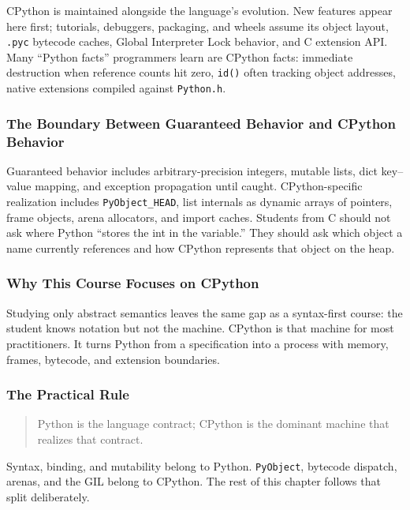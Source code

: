 CPython is maintained alongside the language's evolution. New features appear here first; tutorials, debuggers, packaging, and wheels assume its object layout, \texttt{.pyc} bytecode caches, Global Interpreter Lock behavior, and C extension API. Many ``Python facts'' programmers learn are CPython facts: immediate destruction when reference counts hit zero, \texttt{id()} often tracking object addresses, native extensions compiled against \texttt{Python.h}.

\subsubsection{The Boundary Between Guaranteed Behavior and CPython Behavior}

Guaranteed behavior includes arbitrary-precision integers, mutable lists, dict key--value mapping, and exception propagation until caught. CPython-specific realization includes \texttt{PyObject\_HEAD}, list internals as dynamic arrays of pointers, frame objects, arena allocators, and import caches. Students from C should not ask where Python ``stores the int in the variable.'' They should ask which object a name currently references and how CPython represents that object on the heap.

\subsubsection{Why This Course Focuses on CPython}

Studying only abstract semantics leaves the same gap as a syntax-first course: the student knows notation but not the machine. CPython is that machine for most practitioners. It turns Python from a specification into a process with memory, frames, bytecode, and extension boundaries.

\subsubsection{The Practical Rule}

\begin{quote}
Python is the language contract; CPython is the dominant machine that realizes that contract.
\end{quote}

Syntax, binding, and mutability belong to Python. \texttt{PyObject}, bytecode dispatch, arenas, and the GIL belong to CPython. The rest of this chapter follows that split deliberately.
